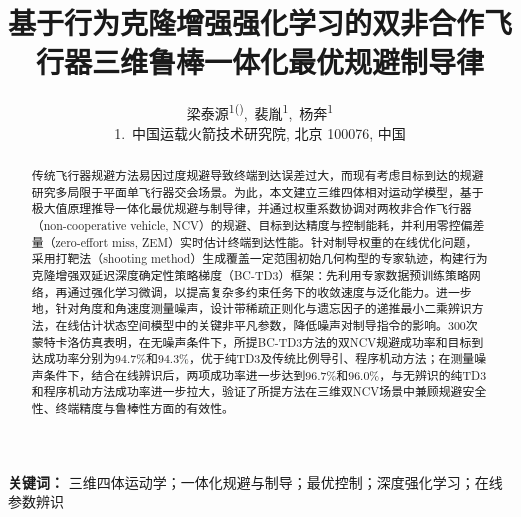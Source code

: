 

\title{基于行为克隆增强强化学习的双非合作飞行器三维鲁棒一体化最优规避制导律}
\author{%
梁泰源\textsuperscript{1()},~裴胤\textsuperscript{1},~杨奔\textsuperscript{1}\\[0.6em]
{\normalsize 1.~中国运载火箭技术研究院, 北京 100076, 中国}%
}
\date{}


\maketitle

\begin{abstract}
传统飞行器规避方法易因过度规避导致终端到达误差过大，而现有考虑目标到达的规避研究多局限于平面单飞行器交会场景。为此，本文建立三维四体相对运动学模型，基于极大值原理推导一体化最优规避与制导律，并通过权重系数协调对两枚非合作飞行器（non-cooperative vehicle, NCV）的规避、目标到达精度与控制能耗，并利用零控偏差量（zero-effort miss, ZEM）实时估计终端到达性能。针对制导权重的在线优化问题，采用打靶法（shooting method）生成覆盖一定范围初始几何构型的专家轨迹，构建行为克隆增强双延迟深度确定性策略梯度（BC-TD3）框架：先利用专家数据预训练策略网络，再通过强化学习微调，以提高复杂多约束任务下的收敛速度与泛化能力。进一步地，针对角度和角速度测量噪声，设计带稀疏正则化与遗忘因子的递推最小二乘辨识方法，在线估计状态空间模型中的关键非平凡参数，降低噪声对制导指令的影响。300次蒙特卡洛仿真表明，在无噪声条件下，所提BC-TD3方法的双NCV规避成功率和目标到达成功率分别为94.7\%和94.3\%，优于纯TD3及传统比例导引、程序机动方法；在测量噪声条件下，结合在线辨识后，两项成功率进一步达到96.7\%和96.0\%，与无辨识的纯TD3和程序机动方法成功率进一步拉大，验证了所提方法在三维双NCV场景中兼顾规避安全性、终端精度与鲁棒性方面的有效性。
\end{abstract}

\noindent\textbf{关键词：} 三维四体运动学；一体化规避与制导；最优控制；深度强化学习；在线参数辨识









\printbibliography[title={参考文献}]

